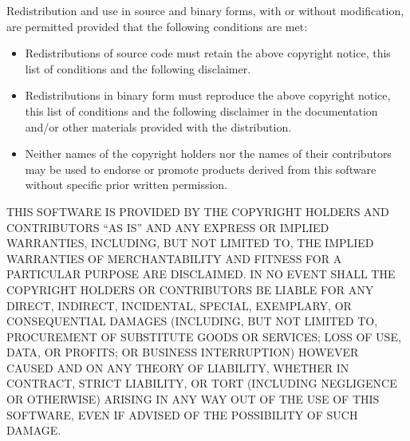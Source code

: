 
Redistribution and use in source and binary forms, with or without
modification, are permitted provided that the following conditions are
met:

\begin{itemize}
\item
Redistributions of source code must retain the above copyright
notice, this list of conditions and the following disclaimer.

\item
Redistributions in binary form must reproduce the above copyright
notice, this list of conditions and the following disclaimer in the
documentation and/or other materials provided with the distribution.

\item
Neither names of the copyright holders nor the names of their
contributors may be used to endorse or promote products derived from
this software without specific prior written permission.
\end{itemize}

THIS SOFTWARE IS PROVIDED BY THE COPYRIGHT HOLDERS AND CONTRIBUTORS
``AS IS'' AND ANY EXPRESS OR IMPLIED WARRANTIES, INCLUDING, BUT NOT
LIMITED TO, THE IMPLIED WARRANTIES OF MERCHANTABILITY AND FITNESS FOR
A PARTICULAR PURPOSE ARE DISCLAIMED.  IN NO EVENT SHALL THE COPYRIGHT
HOLDERS OR CONTRIBUTORS BE LIABLE FOR ANY DIRECT, INDIRECT,
INCIDENTAL, SPECIAL, EXEMPLARY, OR CONSEQUENTIAL DAMAGES (INCLUDING,
BUT NOT LIMITED TO, PROCUREMENT OF SUBSTITUTE GOODS OR SERVICES; LOSS
OF USE, DATA, OR PROFITS; OR BUSINESS INTERRUPTION) HOWEVER CAUSED AND
ON ANY THEORY OF LIABILITY, WHETHER IN CONTRACT, STRICT LIABILITY, OR
TORT (INCLUDING NEGLIGENCE OR OTHERWISE) ARISING IN ANY WAY OUT OF THE
USE OF THIS SOFTWARE, EVEN IF ADVISED OF THE POSSIBILITY OF SUCH
DAMAGE.
